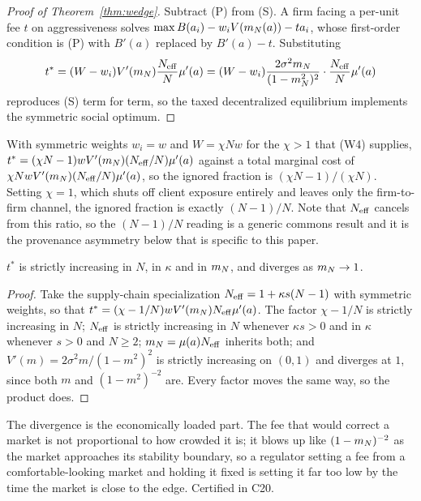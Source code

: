 \begin{proof}[Proof of Theorem~\ref{thm:wedge}]
Subtract (P) from (S). A firm facing a per-unit fee $t$ on aggressiveness solves $\max B(a_i) - w_iV(m_N(a)) - ta_i$, whose first-order condition is (P) with $B'(a)$ replaced by $B'(a)-t$. Substituting
\[
  t^\ast = (W - w_i)V'(m_N)\frac{N_{\mathrm{eff}}}{N}\mu'(a) = (W-w_i)\frac{2\sigma^2m_N}{(1-m_N^2)^2}\cdot\frac{N_{\mathrm{eff}}}{N}\mu'(a)
\]
reproduces (S) term for term, so the taxed decentralized equilibrium implements the symmetric social optimum.
\end{proof}

With symmetric weights $w_i = w$ and $W = \chi Nw$ for the $\chi > 1$ that (W4) supplies, $t^\ast = (\chi N - 1)wV'(m_N)(N_{\mathrm{eff}}/N)\mu'(a)$ against a total marginal cost of $\chi NwV'(m_N)(N_{\mathrm{eff}}/N)\mu'(a)$, so the ignored fraction is $(\chi N-1)/(\chi N)$. Setting $\chi = 1$, which shuts off client exposure entirely and leaves only the firm-to-firm channel, the ignored fraction is exactly $(N-1)/N$. Note that $N_{\mathrm{eff}}$ cancels from this ratio, so the $(N-1)/N$ reading is a generic commons result and it is the provenance asymmetry below that is specific to this paper.

\begin{aproposition}
\label{aprop:cstat}
$t^\ast$ is strictly increasing in $N$, in $\kappa$ and in $m_N$, and diverges as $m_N \to 1$.
\end{aproposition}

\begin{proof}
Take the supply-chain specialization $N_{\mathrm{eff}} = 1+\kappa s(N-1)$ with symmetric weights, so that $t^\ast = (\chi - 1/N)wV'(m_N)N_{\mathrm{eff}}\mu'(a)$. The factor $\chi - 1/N$ is strictly increasing in $N$; $N_{\mathrm{eff}}$ is strictly increasing in $N$ whenever $\kappa s > 0$ and in $\kappa$ whenever $s>0$ and $N \geq 2$; $m_N = \mu(a)N_{\mathrm{eff}}$ inherits both; and $V'(m) = 2\sigma^2m/(1-m^2)^2$ is strictly increasing on $(0,1)$ and diverges at $1$, since both $m$ and $(1-m^2)^{-2}$ are. Every factor moves the same way, so the product does.
\end{proof}

The divergence is the economically loaded part. The fee that would correct a market is not proportional to how crowded it is; it blows up like $(1-m_N)^{-2}$ as the market approaches its stability boundary, so a regulator setting a fee from a comfortable-looking market and holding it fixed is setting it far too low by the time the market is close to the edge. Certified in C20.

